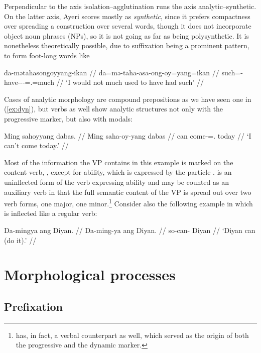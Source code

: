 Perpendicular to the axis isolation–agglutination runs the axis 
analytic–syn\-thetic. On the latter axis, Ayeri scores mostly as 
\emph{synthetic}, since it prefers compactness over spreading a construction 
over several words, though it does not incorporate object noun phrases (NPs), 
so it is not going as far as being poly\-syn\-thetic. It is nonetheless 
theoretically possible, due to suffixation being a prominent pattern, to form 
foot-long words like

\ex\label{ex:footlong}\begingl
	\gla da-mətahasongoyyang-ikan //
	\glb da=mə-taha-asa-ong-oy=yang=ikan //
	\glc such=\Pst{}-have-\Hab{}-\Irr{}-\Neg{}=\Fsg{}.\Aarg{}=much //
	\glft `I would not much used to have had such' //
\endgl\xe

Cases of analytic morphology are compound prepositions as we have seen 
one in (\ref{ex:dyn}), but verbs as well show analytic structures not only with 
the progressive marker, but also with modals:

\ex\begingl
	\gla Ming sahoyyang dabas. //
	\glb Ming saha-oy-yang dabas //
	\glc can come-\Neg{}=\Fsg{}.\Aarg{} today //
	\glft `I can't come today.' //
\endgl\xe

Most of the information the VP contains in this example is marked on the 
content verb, , except for ability, which is expressed 
by the particle .  is an uninflected 
form of the verb expressing ability and may be counted as an auxiliary verb in 
that the full semantic content of the VP is spread out over two verb forms, 
one major, one minor.\footnote{ has, in fact, a verbal 
counterpart  as well, which served as the 
origin of both the progressive and the dynamic marker.} Consider also the 
following example in which  is inflected like a regular verb:

\ex\begingl
	\gla Da-mingya ang Diyan. //
	\glb Da-ming-ya ang Diyan. //
	\glc so-can-\TsgM{} \Aarg{} Diyan //
	\glft `Diyan can (do it).' //
\endgl\xe

\section{Morphological processes}

\subsection{Prefixation}

